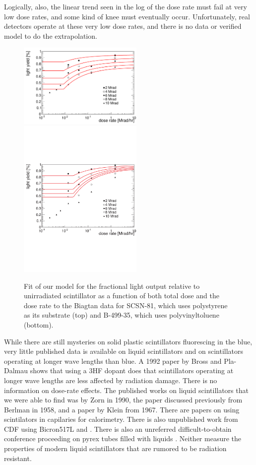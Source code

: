 Logically, also,
the linear trend seen  in the log of the dose rate must fail at 
very low dose rates, and some kind of knee must eventually occur.  
Unfortunately, real detectors operate at these very low dose rates,
and there is no data or verified model to do the extrapolation.



\begin{figure}[!htbp]
\centering
    {\includegraphics[width=6cm]{fitWick8s.pdf}}
    {\includegraphics[width=6cm]{fitWick10bll.pdf}}
\caption{
Fit of our model for the fractional light output relative to
unirradiated scintillator as a function of both total dose
and the dose rate
to the Biagtan data \cite{Biagtan1996125}
for SCSN-81, which uses polystyrene as its substrate (top) and 
B-499-35, which uses polyvinyltoluene (bottom).
}
\label{fig:kevinfit}
\end{figure}

While there are still mysteries on solid plastic scintillators
fluorescing in the blue, very little
published data is available on liquid scintillators and
on scintillators operating at longer wave lengths than blue.
A 1992 paper by Bross and Pla-Dalmau \cite{173178} shows that using
a 3HF dopant does that scintillators operating at longer
wave lengths are less affected by radiation damage.  
There is no information on dose-rate effects.  
The published works on liquid scintillators that we were able
to find was by Zorn \cite{zornliquid} in 1990, the paper
discussed previously from Berlman in 1958, and a paper
by Klein from 1967\cite{Klein1967399}.  
There are papers on using scintilators in capilaries for calorimetry\cite{white}.
There is also
unpublished work from CDF using Bicron517L\cite{kenichi1} and
\cite{kenichi2}.
There is also an unreferred difficult-to-obtain conference
proceeding on pyrex tubes filled with liquids \cite{fsuliquid}.
Neither measure
the properties of modern liquid scintillators that are rumored
to be radiation resistant.


